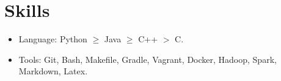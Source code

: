 \documentclass[letterpaper,11pt]{article}
\begin{document}
\section*{Skills}
\begin{itemize}
\item Language: Python $\ge$ Java $\ge$ C++ $>$ C.
\item Tools: Git, Bash, Makefile, Gradle, Vagrant, Docker, Hadoop, Spark, Markdown, Latex.
\end{itemize}
\end{document}
